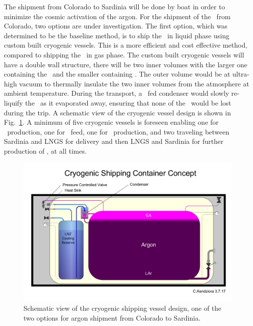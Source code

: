 The shipment from Colorado to Sardinia will be done by boat in order to minimize the cosmic activation of the argon. For the shipment of the \UAr\ from Colorado, two options are under investigation.   The first option, which was determined to be the baseline method, is to ship the \UAr\ in liquid phase using custom built cryogenic vessels.  This is a more efficient and cost effective method, compared to shipping the \UAr\ in gas phase. The custom built cryogenic vessels will have a double wall structure, there will be two inner volumes with the larger one containing the \UAr\ and the smaller containing \LIN.  The outer volume would be at ultra-high vacuum to thermally insulate the two inner volumes from the atmosphere at ambient temperature.  During the transport, a \LIN\ fed condenser would slowly re-liquify the \UAr\ as it evaporated away, ensuring that none of the \UAr\ would be lost during the trip.  A schematic view of the cryogenic vessel design is shown in Fig.~\ref{fig:Urania-UArShipping}.  A minimum of five cryogenic vessels is foreseen enabling one for \Urania\ production, one for \Aria\ feed, one for \Aria\ production, and two traveling between Sardinia and LNGS for delivery and then LNGS and Sardinia for further production of \UAr, at all times.

\begin{figure}[!t]
\centering
\includegraphics[width=\textwidth]{./Figures/Urania-UArShipping.pdf}
\caption[Schematic view of \UAr\ cryogenic shipping vessel]{Schematic view of the cryogenic shipping vessel design, one of the two options for argon shipment from Colorado to Sardinia.}
\label{fig:Urania-UArShipping}
\end{figure}

